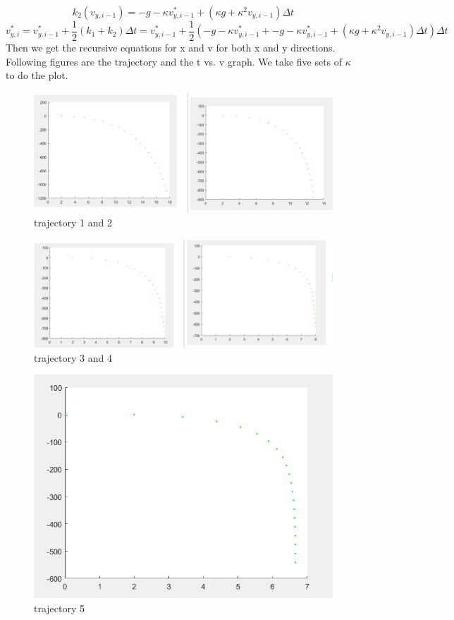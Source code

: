 \documentclass[12pt]{report}
\begin{document}
\begin{equation}
    k_{2}(v_{y,i-1})=-g-\kappa v_{y,i-1}^* +(\kappa g+\kappa^2 v_{y,i-1})\Delta t 
\end{equation}
\begin{equation}
    v_{y,i}^*=v_{y,i-1}^*+\frac{1}{2}(k_{1}+k_{2})\Delta t
   =v_{y,i-1}^*+\frac{1}{2}(-g-\kappa v_{y,i-1}^*+-g-\kappa v_{y,i-1}^* +(\kappa g+\kappa^2 v_{y,i-1})\Delta t )\Delta t
\end{equation}
Then we get the recursive equations for x and v for both x and y directions. Following figures are the trajectory and the t vs. v graph. We take five sets of $\kappa$ to do the plot.\newline
\begin{figure}[h]
    \centering
    \includegraphics[width=1\linewidth]{position121.png}
    \caption{trajectory 1 and 2}
    \label{fig:my_label}
\end{figure}
\begin{figure}
    \centering
    \includegraphics[width=1\linewidth]{position34.png}
    \caption{trajectory 3 and 4}
    \label{fig:my_label}
\end{figure}
\begin{figure}
    \centering
    \includegraphics[width=1\linewidth]{postion5.png}
    \caption{trajectory 5}
    \label{fig:my_label}
\end{figure}
\end{document}
